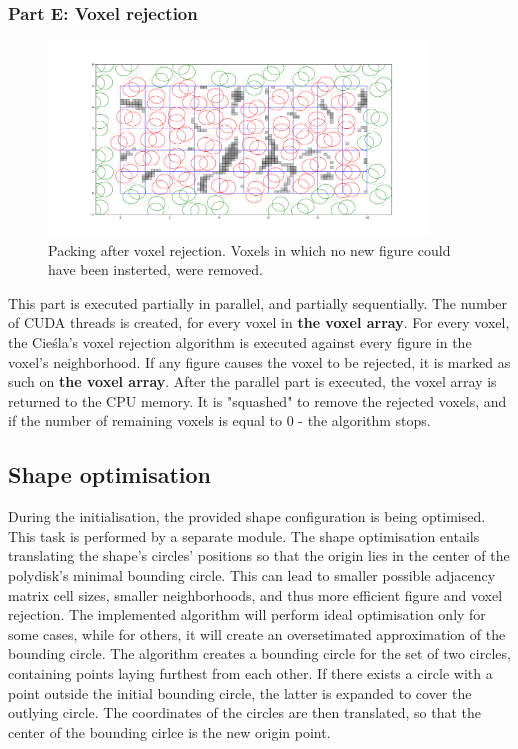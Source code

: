 \documentclass[12pt, oneside]{report}
\begin{document}
\subsubsection{Part E: Voxel rejection}

\begin{figure}[H]
  \centering
	\label{GPURSA_Process_5}
	\includegraphics[width=0.9\textwidth,keepaspectratio]{Images/GPURSA/Figure_6.pdf}
	\caption{Packing after voxel rejection. Voxels in which no new figure could have been insterted, were removed.}
\end{figure}

This part is executed partially in parallel, and partially sequentially. \newline
The number of CUDA threads is created, for every voxel in \textbf{the voxel array}. For every voxel, the Cieśla's voxel rejection algorithm is executed against every figure in the voxel's neighborhood. If any figure causes the voxel to be rejected, it is marked as such on \textbf{the voxel array}. \newline
After the parallel part is executed, the voxel array is returned to the CPU memory. It is "squashed" to remove the rejected voxels, and if the number of remaining voxels is equal to 0 - the algorithm stops.

\subsection{Shape optimisation}

During the initialisation, the provided shape configuration is being optimised. This task is performed by a separate module. The shape optimisation entails translating the shape's circles' positions so that the origin lies in the center of the polydisk's minimal bounding circle. This can lead to smaller possible adjacency matrix cell sizes, smaller neighborhoods, and thus more efficient figure and voxel rejection. \newline
The implemented algorithm will perform ideal optimisation only for some cases, while for others, it will create an oversetimated approximation of the bounding circle. The algorithm creates a bounding circle for the set of two circles, containing points laying furthest from each other. If there exists a circle with a point outside the initial bounding circle, the latter is expanded to cover the outlying circle. The coordinates of the circles are then translated, so that the center of the bounding cirlce is the new origin point.
\end{document}
